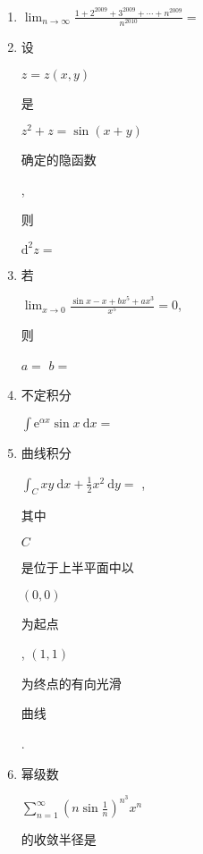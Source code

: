 \documentclass[10pt]{article}
\begin{document}
\begin{enumerate}
  \item $\lim _{n \rightarrow \infty} \frac{1+2^{2009}+3^{2009}+\cdots+n^{2009}}{n^{2010}}=$

  \item \begin{CJK}{UTF8}{mj}设\end{CJK} $z=z(x, y)$ \begin{CJK}{UTF8}{mj}是\end{CJK} $z^{2}+z=\sin (x+y)$ \begin{CJK}{UTF8}{mj}确定的隐函数\end{CJK}, \begin{CJK}{UTF8}{mj}则\end{CJK} $\mathrm{d}^{2} z=$

  \item \begin{CJK}{UTF8}{mj}若\end{CJK} $\lim _{x \rightarrow 0} \frac{\sin x-x+b x^{5}+a x^{3}}{x^{5}}=0$, \begin{CJK}{UTF8}{mj}则\end{CJK} $a=$ $b=$

  \item \begin{CJK}{UTF8}{mj}不定积分\end{CJK} $\int \mathrm{e}^{\alpha x} \sin x \mathrm{~d} x=$

  \item \begin{CJK}{UTF8}{mj}曲线积分\end{CJK} $\int_{C} x y \mathrm{~d} x+\frac{1}{2} x^{2} \mathrm{~d} y=$ , \begin{CJK}{UTF8}{mj}其中\end{CJK} $C$ \begin{CJK}{UTF8}{mj}是位于上半平面中以\end{CJK} $(0,0)$ \begin{CJK}{UTF8}{mj}为起点\end{CJK}, $(1,1)$ \begin{CJK}{UTF8}{mj}为终点的有向光滑\end{CJK} \begin{CJK}{UTF8}{mj}曲线\end{CJK}.

  \item \begin{CJK}{UTF8}{mj}幂级数\end{CJK} $\sum_{n=1}^{\infty}\left(n \sin \frac{1}{n}\right)^{n^{3}} x^{n}$ \begin{CJK}{UTF8}{mj}的收敛半径是\end{CJK}


\end{enumerate}
\end{document}
